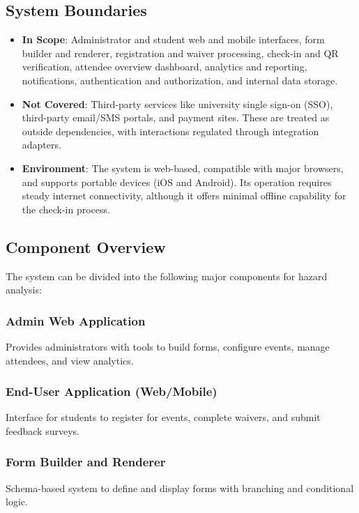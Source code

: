 \documentclass{article}
\begin{document}
\subsection{System Boundaries}

\begin{itemize}
    \item \textbf{In Scope}: Administrator and student web and mobile interfaces, 
    form builder and renderer, registration and waiver processing, check-in and QR verification, 
    attendee overview dashboard, analytics and reporting, notifications, authentication and authorization, 
    and internal data storage.
    
    \item \textbf{Not Covered}: Third-party services like university single sign-on (SSO), 
    third-party email/SMS portals, and payment sites. These are treated as outside dependencies, 
    with interactions regulated through integration adapters.
    
    \item \textbf{Environment}: The system is web-based, compatible with major browsers, 
    and supports portable devices (iOS and Android). Its operation requires steady internet connectivity, 
    although it offers minimal offline capability for the check-in process.
\end{itemize}

\subsection{Component Overview}

The system can be divided into the following major components for hazard analysis:

\subsubsection{Admin Web Application}
Provides administrators with tools to build forms, configure events, manage attendees, and view analytics.

\subsubsection{End-User Application (Web/Mobile)}
Interface for students to register for events, complete waivers, and submit feedback surveys.

\subsubsection{Form Builder and Renderer}
Schema-based system to define and display forms with branching and conditional logic.
\end{document}
